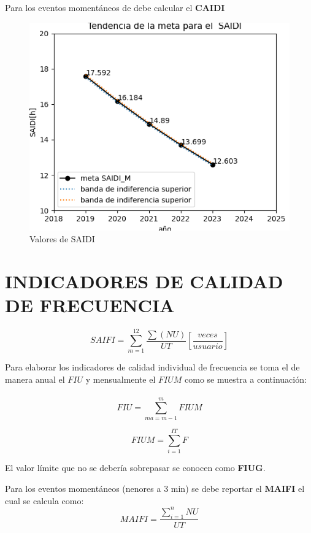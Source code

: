 \documentclass[a5paper]{book}%
\begin{document}
    Para los eventos momentáneos de debe calcular el \textbf{CAIDI}

    \begin{figure}[H]
      \centering
      \caption{Valores de SAIDI}
      \label{fig:valoressaidi}
      \includegraphics[width=\linewidth]{meta_saidi}
    \end{figure}
    
    \section{INDICADORES DE CALIDAD DE FRECUENCIA}
    
    \[ SAIFI  = \sum_{m=1}^{12}\dfrac{\sum(NU)}{UT}   \left[  \dfrac{veces}{usuario} \right]  \]

    Para elaborar los indicadores de calidad  individual de frecuencia se toma el de manera anual el $FIU$ y mensualmente el $FIUM$ como se muestra a continuación:\\\\

    \[  FIU = \sum_{ma=m-1}^{m} FIUM \]

    \[ FIUM = \sum_{i=1}^{IT} F\]

    El  valor límite que no se debería sobrepasar se conocen como  \textbf{FIUG}.

    Para los eventos momentáneos (nenores a 3 min) se debe reportar el \textbf{MAIFI} el cual se calcula como:
    \[ MAIFI = \dfrac{\sum_{i=1}^{n}NU }{UT}\]
    
    
\end{document}
